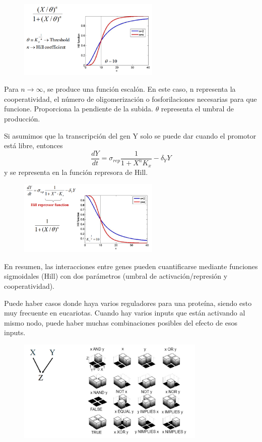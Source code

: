 \begin{enumerate}
\begin{figure}[h]
\centering
\includegraphics[width = 0.6\textwidth]{figs/hill-function.png}
\end{figure}
Para $n \rightarrow \infty$, se produce una función escalón. En este caso, n representa la cooperatividad, el número de oligomerización o fosforilaciones necesarias para que funcione. Proporciona la pendiente de la subida. $\theta$ representa el umbral de producción.

Si asumimos que la transcripción del gen Y solo se puede dar cuando el promotor está libre, entonces
$$\frac{dY}{dt} = \sigma_{rep} \frac{1}{1 + X^n K_x} - \delta_Y Y$$
y se representa en la función represora de Hill.

\begin{figure}[h]
\centering
\includegraphics[width = 0.6\textwidth]{figs/hill-function-rep.png}
\end{figure}

En resumen, las interacciones entre genes pueden cuantificarse mediante funciones sigmoidales (Hill) con dos parámetros (umbral de activación/represión y cooperatividad).
\end{enumerate}

Puede haber casos donde haya varios reguladores para una proteína, siendo esto muy frecuente en eucariotas. Cuando hay varios inputs que están activando al mismo nodo, puede haber muchas combinaciones posibles del efecto de esos inputs. 

\begin{figure}[h]
\centering
\includegraphics[width = 0.8\textwidth]{figs/logic-gates.png}
\end{figure}


